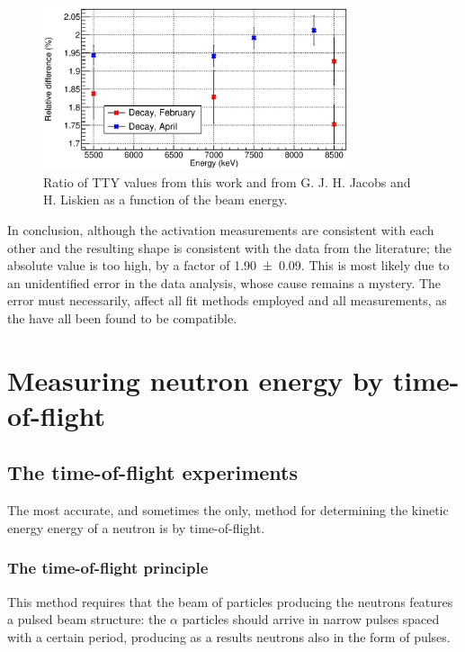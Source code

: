 \documentclass[a4paper,12pt]{report}
\begin{document}
\begin{figure}[H]
	\centering
	\includegraphics[width=0.80\textwidth]{activation_result_diffs.eps}	%
	\caption{Ratio of TTY values from this work and from G. J. H. Jacobs and H. Liskien \cite{jacobs} as a function of the beam energy.}	%
	\label{activation_result_diffs}
\end{figure}

In conclusion, although the activation measurements are consistent with each other and the resulting shape is consistent with the data from the literature; the absolute value is too high, by a factor of \num{1.90(9)}.
This is most likely due to an unidentified error in the data analysis, whose cause remains a mystery.
The error must necessarily, affect all fit methods employed and all measurements, as the have all been found to be compatible.



\chapter{Measuring neutron energy by time-of-flight}

\section{The time-of-flight experiments}
The most accurate, and sometimes the only, method for determining the kinetic energy energy of a neutron is by time-of-flight.

\subsection{The time-of-flight principle} 
This method requires that the beam of particles producing the neutrons features a pulsed beam structure: the $\alpha$ particles should arrive in narrow pulses spaced with a certain period, producing as a results neutrons also in the form of pulses.
\\
\end{document}
